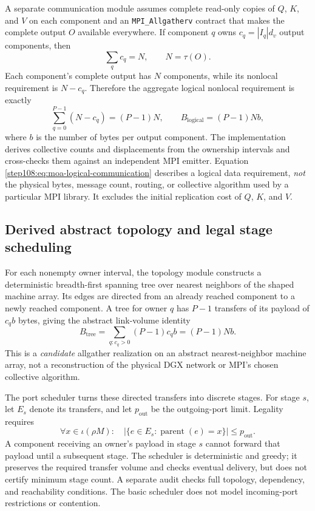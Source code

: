 \documentclass[11pt]{article}
\begin{document}
A separate communication module assumes complete read-only copies of $Q$,
$K$, and $V$ on each component and an \texttt{MPI\_Allgatherv} contract that
makes the complete output $O$ available everywhere.  If component $q$ owns
$c_q=|I_q|d_v$ output components, then
\begin{equation}
  \sum_q c_q=N,\qquad N=\tau(O).
\end{equation}
Each component's complete output has $N$ components, while its nonlocal
requirement is $N-c_q$.  Therefore the aggregate logical nonlocal requirement
is exactly
\begin{equation}
  \sum_{q=0}^{P-1}(N-c_q)=(P-1)N,
  \qquad B_{\mathrm{logical}}=(P-1)N b,
  \label{step108:eq:moa-logical-communication}
\end{equation}
where $b$ is the number of bytes per output component.  The implementation
derives collective counts and displacements from the ownership intervals and
cross-checks them against an independent MPI emitter.  Equation
\eqref{step108:eq:moa-logical-communication} describes a logical data requirement,
\emph{not} the physical bytes, message count, routing, or collective algorithm
used by a particular MPI library.  It excludes the initial replication cost
of $Q$, $K$, and $V$.

\subsection{Derived abstract topology and legal stage scheduling}
\label{step108:subsec:omega-scheduling}

For each nonempty owner interval, the topology module constructs a
deterministic breadth-first spanning tree over nearest neighbors of the shaped
machine array.  Its edges are directed from an already reached component to
a newly reached component.  A tree for owner $q$ has $P-1$ transfers of its
payload of $c_qb$ bytes, giving the abstract link-volume identity
\begin{equation}
  B_{\mathrm{tree}}=\sum_{q:c_q>0}(P-1)c_qb=(P-1)Nb.
  \label{step108:eq:moa-tree-volume}
\end{equation}
This is a \emph{candidate} allgather realization on an abstract nearest-neighbor
machine array, not a reconstruction of the physical DGX network or MPI's
chosen collective algorithm.

The port scheduler turns these directed transfers into discrete stages.  For
stage $s$, let $E_s$ denote its transfers, and let $p_{\mathrm{out}}$ be the
outgoing-port limit.  Legality requires
\begin{equation}
  \forall x\in\iota(\rho M):\quad
  \left|\{e\in E_s:\operatorname{parent}(e)=x\}\right|
  \le p_{\mathrm{out}}.
  \label{step108:eq:moa-port-constraint}
\end{equation}
A component receiving an owner's payload in stage $s$ cannot forward that
payload until a subsequent stage.  The scheduler is deterministic and greedy;
it preserves the required transfer volume and checks eventual delivery, but
does not certify minimum stage count.  A separate audit checks full topology,
dependency, and reachability conditions.  The basic scheduler does not model
incoming-port restrictions or contention.
\end{document}
